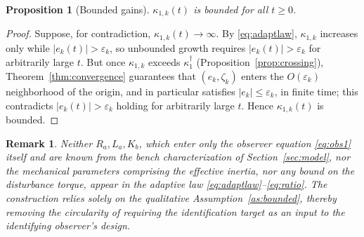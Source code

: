 \documentclass[letterpaper, 10 pt, conference]{ieeeconf}
\newtheorem{proposition}[theorem]{Proposition}
\newtheorem{remark}[theorem]{Remark}
\begin{document}
\begin{proposition}[Bounded gains]
\label{prop:bounded}
$\kappa_{1,k}(t)$ is bounded for all $t\ge0$.
\end{proposition}
\begin{proof}
Suppose, for contradiction, $\kappa_{1,k}(t)\to\infty$. By \eqref{eq:adaptlaw}, $\kappa_{1,k}$ increases only while $|e_k(t)|>\varepsilon_k$, so unbounded growth requires $|e_k(t)|>\varepsilon_k$ for arbitrarily large $t$. But once $\kappa_{1,k}$ exceeds $\kappa_1^\dagger$ (Proposition~\ref{prop:crossing}), Theorem~\ref{thm:convergence} guarantees that $(e_k,\zeta_k)$ enters the $O(\varepsilon_k)$ neighborhood of the origin, and in particular satisfies $|e_k|\le\varepsilon_k$, in finite time; this contradicts $|e_k(t)|>\varepsilon_k$ holding for arbitrarily large $t$. Hence $\kappa_{1,k}(t)$ is bounded.
\end{proof}

\begin{remark}
Neither $R_a,L_a,K_b$, which enter only the observer equation \eqref{eq:obs1} itself and are known from the bench characterization of Section~\ref{sec:model}, nor the mechanical parameters comprising the effective inertia, nor any bound on the disturbance torque, appear in the adaptive law \eqref{eq:adaptlaw}--\eqref{eq:ratio}. The construction relies solely on the qualitative Assumption~\ref{as:bounded}, thereby removing the circularity of requiring the identification target as an input to the identifying observer's design.
\end{remark}
\end{document}
